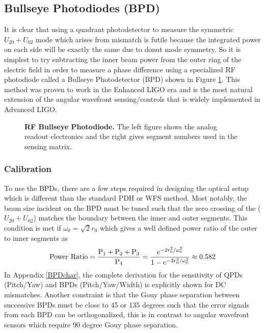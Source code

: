 	\subsection{Bullseye Photodiodes (BPD)}
	It is clear that using a quadrant photodetector to measure the symmetric $U_{20} + U_{02}$ mode which arises from mismatch is futile because the integrated power on each side will be exactly the same due to donut mode symmetry. So it is simplest to try subtracting the inner beam power from the outer ring of the electric field in order to measure a phase difference using a specialized RF photodiode called a Bullseye Photodetector (BPD) shown in Figure \ref{fig:BPD}.  This method was proven to work in the Enhanced LIGO era \cite{MuellerMM} and is the most natural extension of the angular wavefront sensing/controls that is widely implemented in Advanced LIGO.
	
	\begin{figure}[h]
		\centering
		\caption[RF Bullseye Photodiode.]
		{\textbf{RF Bullseye Photodiode.}  The left figure shows the analog readout electronics and the right gives segment numbers used  in the sensing matrix.
		}
		\label{fig:BPD}
	\end{figure}
	
	\subsubsection{Calibration}
		To use the BPDs, there are a few steps required in designing the optical setup which is different than the standard PDH or WFS method.  Most notably, the beam size incident on the BPD must be tuned such that the zero crossing of the ($U_{20} + U_{02}$) matches the boundary between the inner and outer segments.  This condition is met if $\omega_{0} = \sqrt{2} r_0$ which gives a well defined power ratio of the outer to inner segments as 
		\begin{equation}
		\text{Power Ratio} = \frac{\text{P}_1 + \text{P}_2 + \text{P}_3}{\text{P}_4}  \\
		= \frac{e^{-2r_0^2/ \omega_{0}^2}} {1 - e^{-2r_0^2/ \omega_{0}^2 }} \approx 0.582
		\end{equation}
		In Appendix \ref{BPDchar}, the complete derivation for the sensitivity of QPDs (Pitch/Yaw) and BPDs (Pitch/Yaw/Width) is explicitly shown for DC mismatches.  Another constraint is that the Gouy phase separation between successive BPDs must be close to 45 or 135 degrees such that the error signals from each BPD can be orthogonalized, this is in contrast to angular wavefront sensors which require 90 degree Gouy phase separation.  
		
